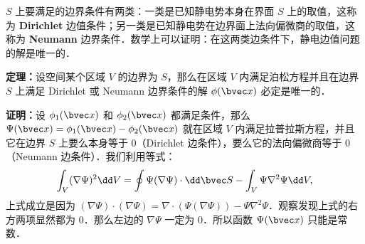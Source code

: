 $S$ 上要满足的边界条件有两类：一类是已知静电势本身在界面 $S$
上的取值，这称为 \textbf{Dirichlet} 边值条件；另一类是已知静电势在边界面上法向偏微商的取值，这称为 \textbf{Neumann} 边界条件．数学上可以证明：在这两类边条件下，静电边值问题的解是唯一的．

\textbf{定理：}设空间某个区域 $V$ 的边界为 $S$，那么在区域 $V$ 内满足泊松方程并且在边界 $S$ 上满足 Dirichlet 或 Neumann 边界条件的解 $\phi(\bvec x)$ 必定是唯一的．

\textbf{证明：}设 $\phi_1(\bvec x)$ 和 $\phi_2(\bvec x)$ 都满足条件，那么 $\Psi(\bvec x)=\phi_1(\bvec x)-\phi_2(\bvec x)$ 就在区域 $V$ 内满足拉普拉斯方程，并且它在边界 $S$ 上要么本身等于 $0$（Dirichlet 边条件），要么它的法向偏微商等于 $0$（Neumann 边条件）．我们利用等式：
\begin{align}
\int_V (\nabla \Psi)^2 \dd V=\oint \Psi(\nabla \Psi)\cdot \dd \bvec S - \int_V \Psi \nabla^2\Psi \dd V,
\end{align}
上式成立是因为 $(\nabla \Psi)\cdot (\nabla \Psi)=\nabla\cdot (\Psi(\nabla\Psi))-\Psi\nabla^2\Psi$．观察发现上式的右方两项显然都为 $0$．那么左边的 $\nabla\Psi$ 一定为 $0$．所以函数 $\Psi(\bvec x)$ 只能是常数．